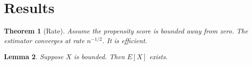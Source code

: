 \documentclass{article}
\newtheorem{thm}{Theorem}
\newtheorem{lem}[thm]{Lemma}
\begin{document}
\section{Results}

\begin{thm}[Rate]\label{thm:rate}
Assume the propensity score is bounded away from zero. %
The estimator converges at rate $n^{-1/2}$. It is efficient.
\end{thm}

\begin{lem}\label{lem:bound}
Suppose $X$ is bounded. Then $E[X]$ exists.
\end{lem}


\end{document}
